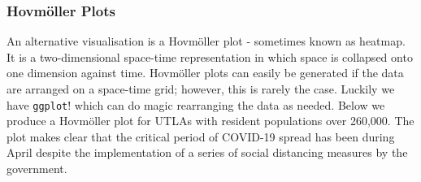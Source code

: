 \documentclass[
  letterpaper,
  DIV=11,
  numbers=noendperiod,
  oneside]{scrreprt}
\begin{document}
\subsubsection{Hovmöller Plots}\label{hovmuxf6ller-plots}

An alternative visualisation is a Hovmöller plot - sometimes known as
heatmap. It is a two-dimensional space-time representation in which
space is collapsed onto one dimension against time. Hovmöller plots can
easily be generated if the data are arranged on a space-time grid;
however, this is rarely the case. Luckily we have \texttt{ggplot}! which
can do magic rearranging the data as needed. Below we produce a
Hovmöller plot for UTLAs with resident populations over 260,000. The
plot makes clear that the critical period of COVID-19 spread has been
during April despite the implementation of a series of social distancing
measures by the government.
\end{document}
